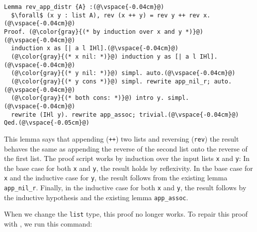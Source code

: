 \begin{lstlisting}
Lemma rev_app_distr {A} :(@\vspace{-0.04cm}@)
  $\forall$ (x y : list A), rev (x ++ y) = rev y ++ rev x.(@\vspace{-0.04cm}@)
Proof. (@\color{gray}{(* by induction over x and y *)}@)(@\vspace{-0.04cm}@)
  induction x as [| a l IHl].(@\vspace{-0.04cm}@)
  (@\color{gray}{(* x nil: *)}@) induction y as [| a l IHl].(@\vspace{-0.04cm}@)
  (@\color{gray}{(* y nil: *)}@) simpl. auto.(@\vspace{-0.04cm}@)
  (@\color{gray}{(* y cons *)}@) simpl. rewrite app_nil_r; auto.(@\vspace{-0.04cm}@)
  (@\color{gray}{(* both cons: *)}@) intro y. simpl.(@\vspace{-0.04cm}@)
  rewrite (IHl y). rewrite app_assoc; trivial.(@\vspace{-0.04cm}@)
Qed.(@\vspace{-0.05cm}@)
\end{lstlisting}
This lemma says that appending (\lstinline{++}) two lists and reversing (\lstinline{rev}) the result behaves the same as appending
the reverse of the second list onto the reverse of the first list.
The proof script works by induction over the input lists \lstinline{x} and \lstinline{y}:
In the base case for both \lstinline{x} and \lstinline{y}, the result holds by reflexivity.
In the base case for \lstinline{x} and the inductive case for \lstinline{y}, the result follows from the existing lemma \lstinline{app_nil_r}.
Finally, in the inductive case for both \lstinline{x} and \lstinline{y}, the result follows by the inductive hypothesis
and the existing lemma \lstinline{app_assoc}.

When we change the \lstinline{list} type, this proof no longer works.
To repair this proof with \toolname, we run this command:

\iffalse
\begin{figure}
\begin{minipage}{0.46\textwidth}
   
\end{minipage}
\hfill
\begin{minipage}{0.46\textwidth}
   
\end{minipage}
\vspace{-0.4cm}
\caption{The updated \lstinline{list} (bottom) is the old \lstinline{list} (top) with its two constructors swapped (\codediff{orange}).}
\label{fig:listswap}
\end{figure}
\fi

